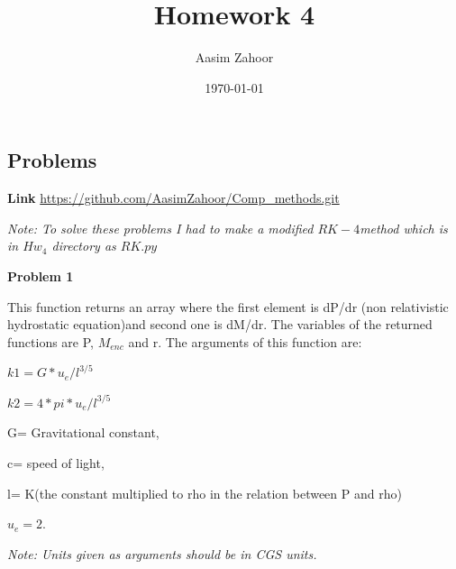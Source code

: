 \documentclass{article}
\title{Homework 4}
\author{Aasim Zahoor}
\date\today
\begin{document}
\maketitle 


\begin{center}
\section{Problems}
\end{center}
\textbf{Link}\vspace{1.5em}
\url{https://github.com/AasimZahoor/Comp_methods.git}
\vspace{1.5em}

\vspace{1.5em}


\emph{\scriptsize{Note: To solve these problems I had to make a modified $RK-4$method which is in $Hw_4$ directory as $RK.py$}}

\vspace{0.5em}
\textbf{Problem 1}
\vspace{1.5em}


This function returns an array where the first element is dP/dr (non relativistic hydrostatic equation)and second one is dM/dr. The variables of the returned functions are P, $M_{enc}$ and r.
    The arguments of this function are:
      \vspace{0.2em}
      
    $k1=G*u_e/l^{3/5}$
    \vspace{0.2em}
    
    $k2=4*pi*u_e/l^{3/5}$
    \vspace{0.2em}
    
        G= Gravitational constant,
        \vspace{0.2em}
        
        c= speed of light,
        \vspace{0.2em}
        
        l= K(the constant multiplied to rho in the relation between P and rho)
        \vspace{0.2em}
        
        $u_{e}=2.$

          \vspace{0.2em}
        \emph{Note: Units given as arguments should be in CGS units.}
  
  \vspace{0.2em}
  
\end{document}
